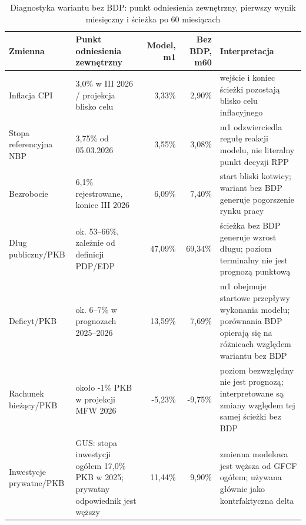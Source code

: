 \begin{table}[H]
\centering
\scriptsize
\caption{Diagnostyka wariantu bez BDP: punkt odniesienia zewnętrzny, pierwszy wynik miesięczny i ścieżka po 60 miesiącach}
\label{tab:baseline-plausibility}
\begin{tabularx}{\textwidth}{@{}L{0.20\textwidth}L{0.20\textwidth}rrX@{}}
\toprule
Zmienna & Punkt odniesienia zewnętrzny & Model, m1 & Bez BDP, m60 & Interpretacja \\
\midrule
Inflacja CPI & 3,0\% w III 2026 / projekcja blisko celu & 3,33\% & 2,90\% & wejście i koniec ścieżki pozostają blisko celu inflacyjnego \\
Stopa referencyjna NBP & 3,75\% od 05.03.2026 & 3,55\% & 3,08\% & m1 odzwierciedla regułę reakcji modelu, nie literalny punkt decyzji RPP \\
Bezrobocie & 6,1\% rejestrowane, koniec III 2026 & 6,09\% & 7,40\% & start bliski kotwicy; wariant bez BDP generuje pogorszenie rynku pracy \\
Dług publiczny/PKB & ok. 53--66\%, zależnie od definicji PDP/EDP & 47,09\% & 69,34\% & ścieżka bez BDP generuje wzrost długu; poziom terminalny nie jest prognozą punktową \\
Deficyt/PKB & ok. 6--7\% w prognozach 2025--2026 & 13,59\% & 7,69\% & m1 obejmuje startowe przepływy wykonania modelu; porównania BDP opierają się na różnicach względem wariantu bez BDP \\
Rachunek bieżący/PKB & około -1\% PKB w projekcji MFW 2026 & -5,23\% & -9,75\% & poziom bezwzględny nie jest prognozą; interpretowane są zmiany względem tej samej ścieżki bez BDP \\
Inwestycje prywatne/PKB & GUS: stopa inwestycji ogółem 17,0\% PKB w 2025; prywatny odpowiednik jest węższy & 11,44\% & 9,90\% & zmienna modelowa jest węższa od GFCF ogółem; używana głównie jako kontrfaktyczna delta \\
\bottomrule
\end{tabularx}
\end{table}

